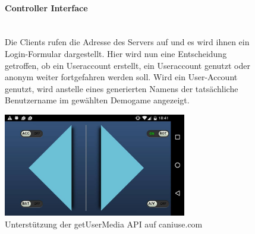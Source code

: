 \documentclass[a4paper]{spie}  %
\begin{document}
\begin{figure}[H]
\begin{minipage}[t]{0.4\textwidth}
\vspace{0pt}
\paragraph{Controller Interface}\mbox{}\\
Die Clients rufen die Adresse des Servers auf und es wird ihnen ein Login-Formular dargestellt. Hier wird nun eine Entscheidung getroffen, ob ein Useraccount erstellt, ein Useraccount genutzt oder anonym weiter fortgefahren werden soll.
Wird ein User-Account genutzt, wird anstelle eines generierten Namens der tatsächliche Benutzername im gewählten Demogame angezeigt.

\end{minipage}
\hfill
\begin{minipage}[t]{0.5\textwidth}
\vspace{0pt}
    \includegraphics[width=8cm]{images/controllerLayoutModern}
     \caption{Unterstützung der getUserMedia API auf caniuse.com}
		\label{fig:test2}
\end{minipage}
\end{figure}
\end{document}
